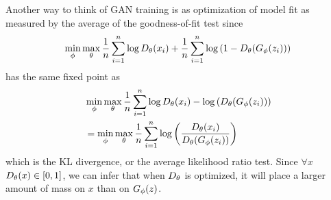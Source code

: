 Another way to think of GAN training is as optimization of model fit
as measured by the average of the goodness-of-fit test since
\begin{align}
  \min_\phi\max_\theta{1 \over n} \sum_{i=1}^n \log{D_\theta(x_i)} + {1
    \over n} \sum_{i=1}^n\log{(1 - D_\theta(G_\phi(z_i)))}
\end{align}
has the same fixed point as
\begin{align}
  & \min_\phi\max_\theta{1 \over n} \sum_{i=1}^n \log{D_\theta(x_i)} - \log{(D_\theta(G_\phi(z_i)))} \\
  & = \min_\phi\max_\theta{1 \over n} \sum_{i=1}^n \log{\left({D_\theta(x_i) \over D_\theta(G_\phi(z_i))}\right)}
\end{align}
which is the KL divergence, or the average likelihood ratio
test. Since $\forall x$ $D_\theta(x) \in [0, 1]$, we can infer that when
$D_\theta$ is optimized, it will place a larger amount of mass on $x$ than
on $G_\phi(z)$.

